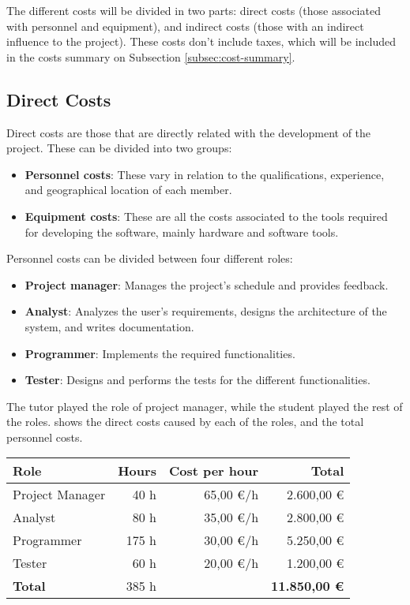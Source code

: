 \makeatother


The different costs will be divided in two parts: direct costs (those associated with personnel and equipment), and indirect costs (those with an indirect influence to the project). These costs don't include taxes, which will be included in the costs summary on Subsection \ref{subsec:cost-summary}.


\subsection{Direct Costs}
Direct costs are those that are directly related with the development of the project. These can be divided into two groups:
\begin{itemize}
  \item \textbf{Personnel costs}: These vary in relation to the qualifications, experience, and geographical location of each member.
  \item \textbf{Equipment costs}: These are all the costs associated to the tools required for developing the software, mainly hardware and software tools.
\end{itemize}

\noindent
Personnel costs can be divided between four different roles:
\begin{itemize}
  \item \textbf{Project manager}: Manages the project's schedule and provides feedback.
  \item \textbf{Analyst}: Analyzes the user's requirements, designs the architecture of the system, and writes documentation.
  \item \textbf{Programmer}: Implements the required functionalities.
  \item \textbf{Tester}: Designs and performs the tests for the different functionalities.
\end{itemize}

The tutor played the role of project manager, while the student played the rest of the roles.  shows the direct costs caused by each of the roles, and the total personnel costs.

\begin{table}[htb]
    {
      \begin{tabular}{lrrr}
        \toprule
        \textbf{Role} & \textbf{Hours} & \textbf{Cost per hour} & \textbf{Total} \\
        \midrule
        Project Manager &  40 h & 65,00 \euro/h & 2.600,00 \euro \\
        Analyst         &  80 h & 35,00 \euro/h & 2.800,00 \euro \\
        Programmer      & 175 h & 30,00 \euro/h & 5.250,00 \euro \\
        Tester          &  60 h & 20,00 \euro/h & 1.200,00 \euro \\
        \midrule
        \textbf{Total}  & 385 h &           & \textbf{11.850,00 \euro} \\
        \bottomrule
      \end{tabular}
    }
\end{table}

